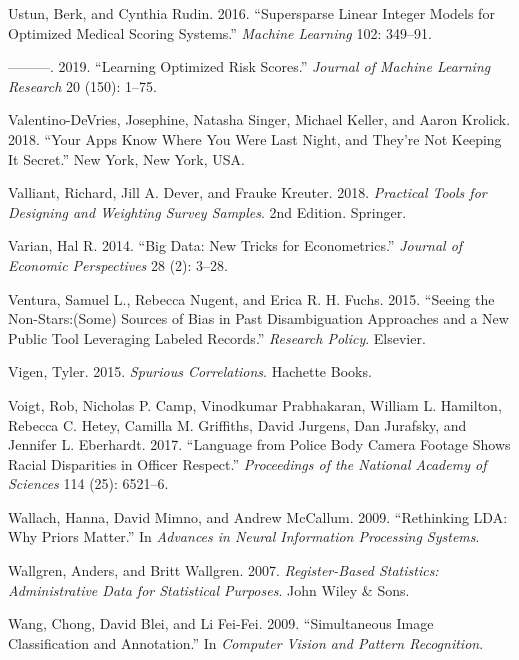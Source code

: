 \documentclass[]{krantz}
\begin{document}
\hypertarget{ref-Ustun2016}{}
Ustun, Berk, and Cynthia Rudin. 2016. ``Supersparse Linear Integer
Models for Optimized Medical Scoring Systems.'' \emph{Machine Learning}
102: 349--91.

\hypertarget{ref-Ustun2019}{}
---------. 2019. ``Learning Optimized Risk Scores.'' \emph{Journal of
Machine Learning Research} 20 (150): 1--75.

\hypertarget{ref-Valentino-DeVries}{}
Valentino-DeVries, Josephine, Natasha Singer, Michael Keller, and Aaron
Krolick. 2018. ``Your Apps Know Where You Were Last Night, and They're
Not Keeping It Secret.'' New York, New York, USA.

\hypertarget{ref-valliant2018practical}{}
Valliant, Richard, Jill A. Dever, and Frauke Kreuter. 2018.
\emph{Practical Tools for Designing and Weighting Survey Samples}. 2nd
Edition. Springer.

\hypertarget{ref-varian2014big}{}
Varian, Hal R. 2014. ``Big Data: New Tricks for Econometrics.''
\emph{Journal of Economic Perspectives} 28 (2): 3--28.

\hypertarget{ref-ventura2015seeing}{}
Ventura, Samuel L., Rebecca Nugent, and Erica R. H. Fuchs. 2015.
``Seeing the Non-Stars:(Some) Sources of Bias in Past Disambiguation
Approaches and a New Public Tool Leveraging Labeled Records.''
\emph{Research Policy}. Elsevier.

\hypertarget{ref-spurious2}{}
Vigen, Tyler. 2015. \emph{Spurious Correlations}. Hachette Books.

\hypertarget{ref-Voigt2017}{}
Voigt, Rob, Nicholas P. Camp, Vinodkumar Prabhakaran, William L.
Hamilton, Rebecca C. Hetey, Camilla M. Griffiths, David Jurgens, Dan
Jurafsky, and Jennifer L. Eberhardt. 2017. ``Language from Police Body
Camera Footage Shows Racial Disparities in Officer Respect.''
\emph{Proceedings of the National Academy of Sciences} 114 (25):
6521--6.

\hypertarget{ref-wallach-09b}{}
Wallach, Hanna, David Mimno, and Andrew McCallum. 2009. ``Rethinking
LDA: Why Priors Matter.'' In \emph{Advances in Neural Information
Processing Systems}.

\hypertarget{ref-wallgren2007register}{}
Wallgren, Anders, and Britt Wallgren. 2007. \emph{Register-Based
Statistics: Administrative Data for Statistical Purposes}. John Wiley \&
Sons.

\hypertarget{ref-wang-09b}{}
Wang, Chong, David Blei, and Li Fei-Fei. 2009. ``Simultaneous Image
Classification and Annotation.'' In \emph{Computer Vision and Pattern
Recognition}.
\end{document}
